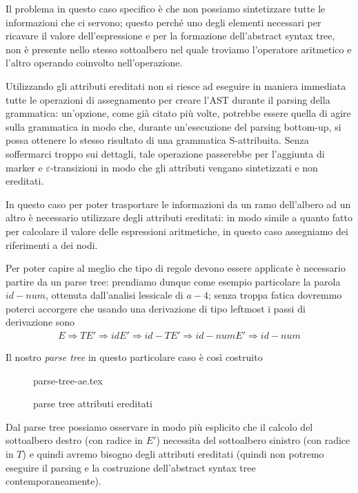 \documentclass[class=book, crop=false, oneside, 12pt]{standalone}
\begin{document}

Il problema in questo caso specifico è che non possiamo sintetizzare tutte le informazioni che ci servono;
questo perché uno degli elementi necessari per ricavare il valore dell'espressione e per la formazione dell'abstract syntax tree, non è presente nello stesso sottoalbero nel quale troviamo l'operatore aritmetico e l'altro operando coinvolto nell'operazione. 

Utilizzando gli attributi ereditati non si riesce ad eseguire in maniera immediata tutte le operazioni di assegnamento per creare l'AST durante il parsing della grammatica: un'opzione, come già citato più volte, potrebbe essere quella di agire sulla grammatica in modo che, durante un'esecuzione del parsing bottom-up, si possa ottenere lo stesso risultato di una grammatica S-attribuita. Senza soffermarci troppo sui dettagli, tale operazione passerebbe per l'aggiunta di marker e \(\varepsilon\)-transizioni in modo che gli attributi vengano sintetizzati e non ereditati.

In questo caso per poter trasportare le informazioni da un ramo dell'albero ad un altro è necessario utilizzare degli attributi ereditati: in modo simile a quanto fatto per calcolare il valore delle espressioni aritmetiche, in questo caso assegniamo dei riferimenti a dei nodi. 

Per poter capire al meglio che tipo di regole devono essere applicate è necessario partire da un parse tree: prendiamo dunque come esempio particolare la parola \(id - num\), ottenuta dall'analisi lessicale di \(a - 4\); senza troppa fatica dovremmo poterci accorgere che usando una derivazione di tipo leftmost i passi di derivazione sono
\begin{align*}
    E \Rightarrow TE' \Rightarrow idE' \Rightarrow id-TE' \Rightarrow id-numE' \Rightarrow id-num
\end{align*}

Il nostro \emph{parse tree} in questo particolare caso è così costruito

\begin{figure}[H]
	\centering
    {parse-tree-ae.tex}
    \caption{parse tree attributi ereditati}
    \label{fig:parse-tree-ae}
\end{figure}

Dal parse tree possiamo osservare in modo più esplicito che il calcolo del sottoalbero destro (con radice in \(E'\)) necessita del sottoalbero sinistro (con radice in \(T\)) e quindi avremo bisogno degli attributi ereditati (quindi non potremo eseguire il parsing e la costruzione dell'abstract syntax tree contemporaneamente).
\end{document}
